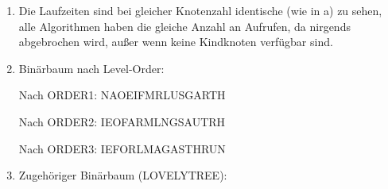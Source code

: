 \documentclass{article}
\begin{document}
\begin{enumerate}[\bfseries1.]
\begin{enumerate}
            \item 
                Die Laufzeiten sind bei gleicher Knotenzahl identische (wie in a) zu sehen, alle Algorithmen haben die gleiche Anzahl an Aufrufen, da nirgends abgebrochen wird, außer wenn keine Kindknoten verfügbar sind.

            \item
                Binärbaum nach Level-Order:
                
                
                Nach ORDER1: NAOEIFMRLUSGARTH
                
                Nach ORDER2: IEOFARMLNGSAUTRH
                
                Nach ORDER3: IEFORLMAGASTHRUN 

            \item 
                Zugehöriger Binärbaum (LOVELYTREE):
                

\end{enumerate}
\end{enumerate}
\end{document}
